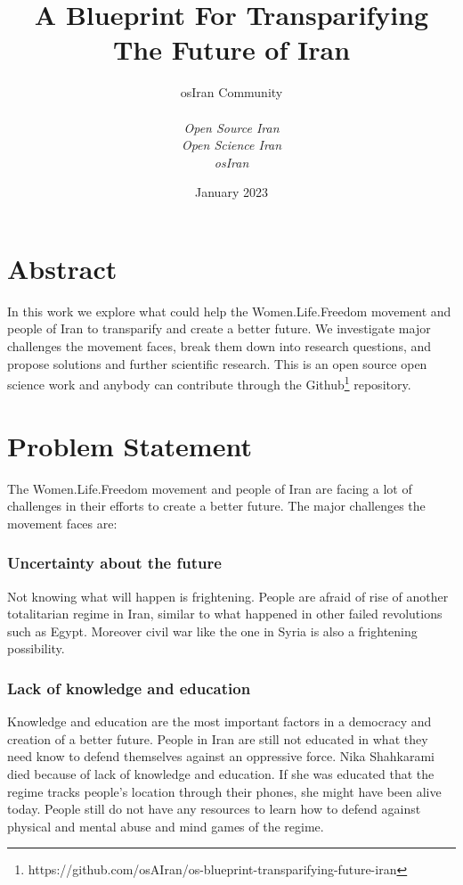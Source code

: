 \documentclass{IEEEtran}
\title{ \Huge \textbf{A Blueprint For Transparifying The Future of Iran} \\[0.5cm]}
\author{
\begin{tabular}{ll}
osIran Community
\end{tabular} \bigskip \\

\textit{Open Source Iran} \\
\textit{Open Science Iran}\\
\textit{osIran}\\

}
\date{January 2023}
\newcommand{\note}[1]{\todo[inline]{#1}}
\begin{document}
\maketitle




\section{Abstract}

In this work we explore what could help the Women.Life.Freedom movement and people of Iran to transparify and create a better future.
 We investigate major challenges the movement faces, break them down into research questions, and propose solutions and further scientific research.
This is an open source open science work and anybody can contribute through the Github\footnote{https://github.com/osAIran/os-blueprint-transparifying-future-iran} repository.


\section{Problem Statement}
The Women.Life.Freedom movement and people of Iran are facing a lot of challenges in their efforts to create a better future. 
The major challenges the movement faces are:
\subsubsection{Uncertainty about the future}
Not knowing what will happen is frightening. 
People are afraid of rise of another totalitarian regime in Iran, similar to what happened in other failed revolutions such as Egypt.
Moreover civil war like the one in Syria is also a frightening possibility.

\subsubsection{Lack of knowledge and education}
Knowledge and education are the most important factors in a democracy and creation of a better future.
People in Iran are still not educated in what they need know to defend themselves against an oppressive force.
Nika Shahkarami died because of lack of knowledge and education. If she was educated that 
the regime tracks people's location through their phones, she might have been alive today.
People still do not have any resources to learn how to defend against physical and mental abuse and mind games of the regime. 
\end{document}
